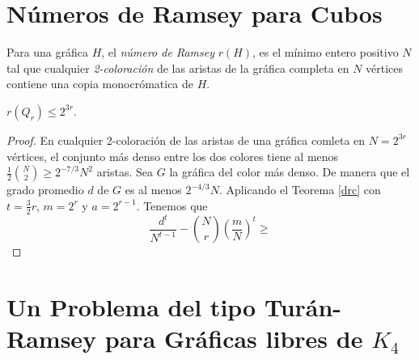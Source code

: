   \section{Números de Ramsey para Cubos}
  Para una gráfica $H$, el \textit{número de Ramsey} $r(H)$, es el
  mínimo entero positivo $N$ tal que cualquier \textit{2-coloración}
  de las aristas de la gráfica completa en $N$ vértices contiene una
  copia monocrómatica de $H$.
  \begin{theorem}
    $r(Q_r) \leq 2^{3r}$.
  \end{theorem}
  \begin{proof}
    En cualquier 2-coloración de las aristas de una gráfica comleta
    en $N = 2^{3r}$ vértices, el conjunto más denso entre los dos
    colores tiene al menos
    $\frac{1}{2} \binom{N}{2} \geq 2^{-7/3} N^2$ aristas. Sea $G$ la gráfica
    del color más denso. De manera que el grado promedio $d$ de $G$
    es al menos $2^{-4/3}N$. Aplicando el Teorema \ref{drc} con $t = \frac{3}{2}r$, $m = 2^r$ y $a = 2^{r-1}$. Tenemos que
    $$\frac{d^t}{N^{t-1}} - \binom{N}{r} \left(\frac{m}{N}\right)^t \geq $$ 
  \end{proof}

  \section{Un Problema del tipo Turán-Ramsey para Gráficas libres de $K_4$}
